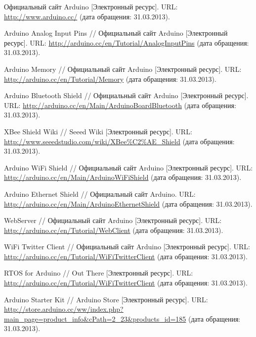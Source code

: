 \begin{thebibliography}{99}
Официальный сайт Arduino [Электронный ресурс].
URL: \url{http://www.arduino.cc/} (дата обращения: 31.03.2013).

Arduino Analog Input Pins // Официальный сайт Arduino [Электронный ресурс]. 
URL: \url{http://arduino.cc/en/Tutorial/AnalogInputPins} (дата обращения: 31.03.2013).

Arduino Memory // Официальный сайт Arduino [Электронный ресурс]. 
URL: \url{http://arduino.cc/en/Tutorial/Memory} (дата обращения: 31.03.2013).

Arduino Bluetooth Shield // Официальный сайт Arduino [Электронный ресурс]. 
URL: \url{http://arduino.cc/en/Main/ArduinoBoardBluetooth} (дата обращения: 31.03.2013).

XBee Shield Wiki // Seeed Wiki [Электронный ресурс]. 
URL: \url{http://www.seeedstudio.com/wiki/XBee\%C2\%AE_Shield} (дата обращения: 31.03.2013).

Arduino WiFi Shield // Официальный сайт Arduino [Электронный ресурс].  
URL: \url{http://arduino.cc/en/Main/ArduinoWiFiShield} (дата обращения: 31.03.2013).

Arduino Ethernet Shield // Официальный сайт Arduino.  
URL: \url{http://arduino.cc/en/Main/ArduinoEthernetShield} (дата обращения: 31.03.2013).

WebServer // Официальный сайт Arduino [Электронный ресурс].  
URL: \url{http://arduino.cc/en/Tutorial/WebClient} (дата обращения: 31.03.2013).

WiFi Twitter Client // Официальный сайт Arduino [Электронный ресурс].  
URL: \url{http://arduino.cc/en/Tutorial/WiFiTwitterClient} (дата обращения: 31.03.2013).

RTOS for Arduino // Out There [Электронный ресурс].  
URL: \url{http://arduino.cc/en/Tutorial/WiFiTwitterClient} (дата обращения: 31.03.2013).

Arduino Starter Kit // Arduino Store [Электронный ресурс].  
URL: \url{http://store.arduino.cc/ww/index.php?main_page=product_info&cPath=2_23&products_id=185} (дата обращения: 31.03.2013).



\end{thebibliography}
